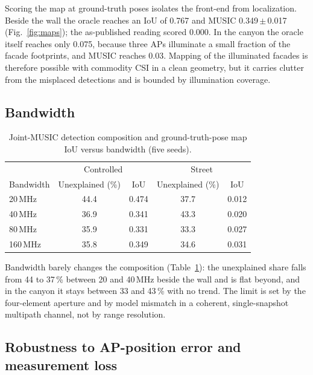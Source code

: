 \documentclass[preprint,12pt]{elsarticle}
\begin{document}
Scoring the map at ground-truth poses isolates the front-end from localization. Beside the wall
the oracle reaches an IoU of 0.767 and MUSIC 0.349\,$\pm$\,0.017 (Fig.~\ref{fig:maps}); the
as-published reading scored 0.000. In the canyon the oracle itself reaches only 0.075, because
three APs illuminate a small fraction of the facade footprints, and MUSIC reaches 0.03. Mapping of
the illuminated facades is therefore possible with commodity CSI in a clean geometry, but it
carries clutter from the misplaced detections and is bounded by illumination coverage.

\subsection{Bandwidth}\label{sec:bw}

\begin{table}[t]\centering\small
\caption{Joint-MUSIC detection composition and ground-truth-pose map IoU versus bandwidth
(five seeds).}
\label{tab:bw}
\begin{tabular}{@{}lcccc@{}}
\toprule
 & \multicolumn{2}{c}{Controlled} & \multicolumn{2}{c}{Street} \\
Bandwidth & Unexplained (\%) & IoU & Unexplained (\%) & IoU \\ \midrule
20\,MHz  & 44.4 & 0.474 & 37.7 & 0.012 \\
40\,MHz  & 36.9 & 0.341 & 43.3 & 0.020 \\
80\,MHz  & 35.9 & 0.331 & 33.3 & 0.027 \\
160\,MHz & 35.8 & 0.349 & 34.6 & 0.031 \\
\bottomrule
\end{tabular}
\end{table}

Bandwidth barely changes the composition (Table~\ref{tab:bw}): the unexplained share falls from
44 to 37\,\% between 20 and 40\,MHz beside the wall and is flat beyond, and in the canyon it stays
between 33 and 43\,\% with no trend. The limit is
set by the four-element aperture and by model mismatch in a coherent, single-snapshot multipath
channel, not by range resolution.

\subsection{Robustness to AP-position error and measurement loss}\label{sec:robust}
\end{document}
